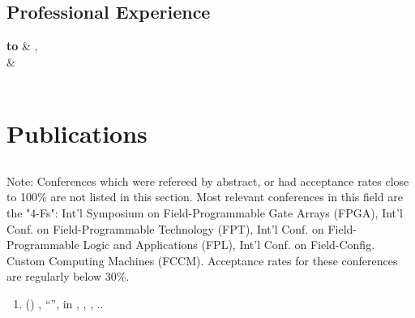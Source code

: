 \documentclass[10pt, oneside]{article}
\begin{document}
\begin{center}

    \section{Professional Experience}
    \textbf{ to}      & \textbf{}, \emph{} \\
    \textbf{} &  \\
    \\
    
  \end{center}
  

    \section*{Publications}

    \subsection*{}
    Note:  Conferences which were refereed by abstract, or had acceptance rates close to 100\% are not listed in this section.  Most relevant conferences in this field are the "4-Fs": Int'l Symposium on Field-Programmable Gate Arrays (FPGA), Int'l Conf. on Field-Programmable Technology (FPT), Int'l Conf. on Field-Programmable Logic and Applications (FPL), Int'l Conf. on Field-Config. Custom Computing Machines (FCCM).  Acceptance rates for these conferences are regularly below 30\%. 
    
    \begin{enumerate}[resume]
      
      \item {}(\textit{}) , ``'', in , , , .\textbf{}.
    \end{enumerate}
\end{document}
